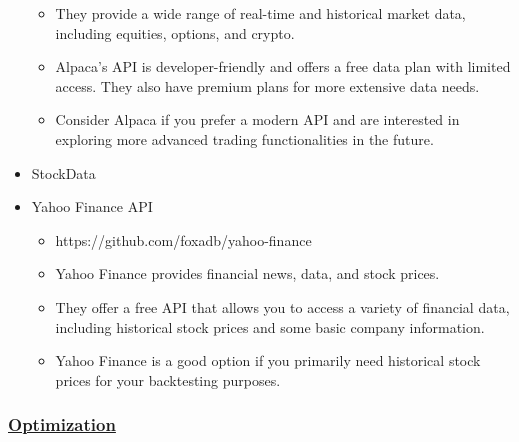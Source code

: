 \documentclass{assignment}
\begin{document}
\begin{problem}
\begin{itemize}
\begin{itemize}
        \item They provide a wide range of real-time and historical market data, including equities, options, and crypto. \
        \item Alpaca's API is developer-friendly and offers a free data plan with limited access. They also have premium plans for more extensive data needs. \
        \item Consider Alpaca if you prefer a modern API and are interested in exploring more advanced trading functionalities in the future. \ 
    \end{itemize}
    \item StockData
    \item Yahoo Finance API 
    \begin{itemize}
        \item https://github.com/foxadb/yahoo-finance 
        \item Yahoo Finance provides financial news, data, and stock prices. 
        \item They offer a free API that allows you to access a variety of financial data, including historical stock prices and some basic company information. 
        \item Yahoo Finance is a good option if you primarily need historical stock prices for your backtesting purposes.
    \end{itemize}
\end{itemize} 

\subsubsection*{\underline{Optimization}}


\end{problem}
\end{document}
